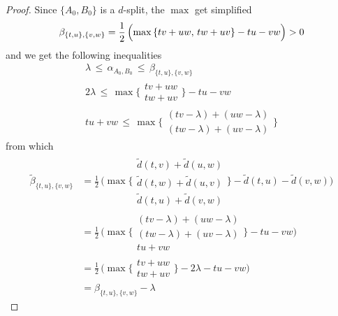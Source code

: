 \documentclass[./main.tex]{subfiles}
\begin{document}
\begin{proof}
    Since $\{A_0,B_0\}$ is a $d$-split, the $\max$ get simplified
    \[ \beta_{\{t,u\},\{v,w\}} = \frac{1}{2}\, \Bigl( \max {\{ tv + uw,\, tw + uv \}} - tu - vw \Bigr) > 0 \]
    and we get the following inequalities
    \begin{gather*}
        \lambda \,\leq\, \alpha_{A_0,B_0} \,\leq\, \beta_{\{t,u\},\{v,w\}} \\[2pt]
        2 \lambda \,\leq\, \max {\biggl\{\!\!
            \begin{array}{c}
                tv + uw \\
                tw + uv
            \end{array}
        \!\!\biggr\}} - tu - vw \\[2pt]
        tu + vw \,\leq\, \max {\biggl\{\!\!
            \begin{array}{c}
                (tv - \lambda) + (uw - \lambda) \\
                (tw - \lambda) + (uv - \lambda)
            \end{array}
        \!\!\biggr\}}
    \end{gather*}
    from which
    \begin{align*}
        \widetilde{\beta}_{\{t,u\},\{v,w\}} &= \frac{1}{2}\, \Biggl( \max {\Biggl\{\!
            \begin{array}{c}
                \tilde{d}(t,v) + \tilde{d}(u,w) \\
                \tilde{d}(t,w) + \tilde{d}(u,v) \\
                \tilde{d}(t,u) + \tilde{d}(v,w)
            \end{array}
        \!\!\Biggr\}} - \tilde{d}(t,u) - \tilde{d}(v,w) \Biggr) \\
        &= \frac{1}{2}\, \Biggl( \max {\Biggl\{\!\!
            \begin{array}{c}
                (tv - \lambda) + (uw - \lambda) \\
                (tw - \lambda) + (uv - \lambda) \\
                tu + vw
            \end{array}
        \!\!\Biggr\}} - tu - vw \Biggr) \\
        &= \frac{1}{2}\, \biggl( \max {\biggl\{\!\!
            \begin{array}{c}
                tv + uw \\
                tw + uv
            \end{array}
        \!\!\biggr\}} - 2 \lambda - tu - vw \biggr) \\[2pt]
        &= \beta_{\{t,u\},\{v,w\}} - \lambda
    \end{align*}


\end{proof}
\end{document}
